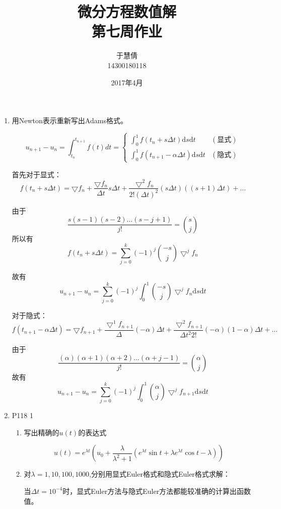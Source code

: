 \documentclass{ctexart}
\title{微分方程数值解 \\ 第七周作业}
\author{于慧倩 \\ 14300180118}
\date{2017年4月}
\begin{document}
\maketitle

\newpage

\begin{enumerate}
\item
用Newton表示重新写出Adams格式。

\[ u_{n+1}-u_n = \int_{t_n}^{t_{n+1}} f(t)dt =  \left\{ \begin{array}{rl}\int_0^1 f(t_n+s \Delta t) \mbox{d}s \mbox{d} t  &(\mbox{显式}) \\
 \int_0^1 f(t_{n+1} - \alpha \Delta t) \mbox{d}s \mbox{d} t &(\mbox{隐式})\end{array} \right.\]

首先对于显式：
\[f(t_n+s \Delta t)=\bigtriangledown f_n+\frac{\bigtriangledown f_n}{\Delta t}s \Delta t+\frac{\bigtriangledown^2 f_n}{2!(\Delta t)^2}(s\Delta t)((s+1)\Delta t)+\dots\]

由于
\[ \frac{s(s-1)(s-2)\dots(s-j+1)}{j!}={s\choose j}\]
所以有
\[f(t_n+s\Delta t) =\sum_{j=0}^{k}(-1)^j {-s\choose j}  \bigtriangledown^j f_n \]

故有
\[u_{n+1}-u_n =\sum_{j=0}^k (-1)^j \int_0^1 {-s\choose j}\bigtriangledown^j f_n \mbox{d}s \mbox{d}t\]

对于隐式：
\[ f(t_{n+1} - \alpha \Delta t) =\bigtriangledown f_{n+1} + \frac{\bigtriangledown^1 f_{n+1}}{\Delta}(- \alpha)\Delta t+\frac{\bigtriangledown^2 f_{n+1}}{\Delta t^2 2!}(-\alpha)(1-\alpha)\Delta t+\dots\]

由于
\[ \frac{(\alpha)(\alpha+1)(\alpha+2)\dots(\alpha+j-1)}{j!}={\alpha\choose j}\]
故有
\[ u_{n+1}-u_n = \sum_{j=0}^k (-1)^j \int_0^1 {\alpha\choose j}\bigtriangledown^j f_{n+1} \mbox{d}s \mbox{d}t \]


\item P118 1

\begin{enumerate}

\item 写出精确的\(u(t)\)的表达式

\[u(t)=e^{\lambda t}(u_0+\frac{\lambda}{\lambda^2+1} (e^{\lambda t} \sin t+\lambda e^{\lambda t}\cos t-\lambda)) \]

\item 对\(\lambda =1,10,100,1000\),分别用显式Euler格式和隐式Euler格式求解：

当\(\Delta t = 10^{-4}\)时，显式Euler方法与隐式Euler方法都能较准确的计算出函数值。


\end{enumerate}
\end{enumerate}
\end{document}

